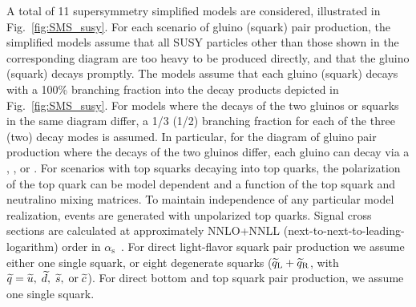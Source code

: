 A total of 11 supersymmetry simplified models are considered, illustrated
in Fig.~\ref{fig:SMS_susy}.
For each scenario of gluino (squark) pair production, the simplified models assume that
all SUSY particles other than 
those shown in the corresponding diagram
are too heavy to be produced directly, and that the gluino (squark) decays promptly.
The models assume that each gluino (squark) decays with a 100\% branching fraction 
into the decay products depicted in Fig.~\ref{fig:SMS_susy}.
For models where the decays of the two gluinos or squarks in the same diagram differ, a 1/3 (1/2)
branching fraction for each of the three (two) decay modes is assumed.
In particular, for the diagram of gluino pair production where the decays of the two gluinos 
differ, each gluino can decay via a \chizz, \charginoplus, or \charginominus.
For scenarios with top squarks decaying into top quarks, the polarization of the
top quark can be model dependent and a function of the top squark and neutralino mixing matrices.
To maintain independence of any particular model realization, 
events are generated with unpolarized top quarks.
Signal cross sections are calculated at approximately NNLO+NNLL (next-to-next-to-leading-logarithm) order in 
$\alpha_{\mathrm{s}}$~\cite{Beenakker:nnll}.
For direct light-flavor squark pair production we assume either one single squark, 
or eight degenerate squarks ($\widetilde{q}_{\mathrm{L}}+\widetilde{q}_{\mathrm{R}}$, with $\widetilde{q}=\widetilde{u},\;\widetilde{d},\;\widetilde{s},\;\text{or}\;\widetilde{c}$). 
For direct bottom and top squark pair production, we assume one single squark.


